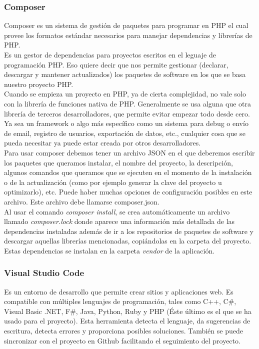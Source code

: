 \subsubsection{Composer}
Composer es un sistema de gestión de paquetes para programar en PHP el cual provee los formatos estándar necesarios para manejar dependencias y librerías de PHP. \cite{Composer:definicion}\\
Es un gestor de dependencias para proyectos escritos en el leguaje de programación PHP. Eso quiere decir que nos permite gestionar (declarar, descargar y mantener actualizados) los paquetes de software en los que se basa nuestro proyecto PHP.\\
Cuando se empieza un proyecto en PHP, ya de cierta complejidad, no  vale solo con la librería de funciones nativa de PHP. Generalmente se usa alguna que otra librería de terceros desarrolladores, que permite evitar empezar todo desde cero. Ya sea un framework o algo más específico como un sistema para debug o envío de email, registro de usuarios, exportación de datos, etc., cualquier cosa que se pueda necesitar ya puede estar creada por otros desarrolladores.\\
Para usar composer debemos tener un archivo JSON en el que deberemos escribir los paquetes que queramos instalar, el nombre del proyecto, la descripción, algunos comandos que queramos que se ejecuten en el momento de la instalación o de la actualización (como por ejemplo generar la clave del proyecto u optimizarlo), etc. Puede haber muchas opciones de configuración posibles en este archivo. 
Este archivo debe llamarse composer.json.\\
Al usar el comando \textit{composer install}, se crea automáticamente un archivo llamado \textit{composer.lock} donde aparece una información más detallada de las dependencias instaladas además de ir a los repositorios de paquetes de software y descargar aquellas librerías mencionadas, copiándolas en la carpeta del proyecto.\\
Estas dependencias se instalan en la carpeta \textit{vendor} de la aplicación.\cite{composer}
\subsubsection{Visual Studio Code}
Es un entorno de desarrollo que permite crear sitios y aplicaciones web. Es compatible con múltiples lenguajes de programación, tales como C++, C\#, Visual Basic .NET, F\#, Java, Python, Ruby y PHP (Éste último es el que se ha usado para el proyecto).\cite{VisualStudio} 
Esta herramienta detecta el lenguaje, da sugerencias de escritura, detecta errores y proporciona posibles soluciones. También se puede sincronizar con el proyecto en Github facilitando el seguimiento del proyecto.
